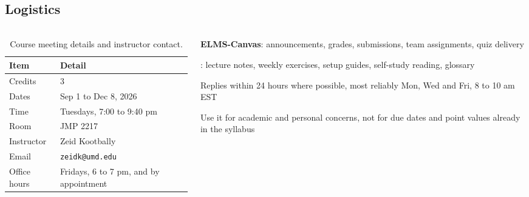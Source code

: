 \documentclass[
    10pt,
    dvipsnames,
    svgnames,
    x11names,
    aspectratio=1610,
    english,
    codeminted]{beamer}
\begin{document}
\subsection*{Logistics}
\begingroup
\divframetrue
\renewcommand{\divbartextA}{\secname}
\renewcommand{\divbartextB}{}
\begin{frame}{\secname}
  \divbar{\secname}{\subsecname}
  \framesubtitle{\subsecname}
\begin{columns}[T,onlytextwidth]
\begin{column}{0.48\textwidth}
\begin{table}[h]
\caption{Course meeting details and instructor contact.}
\footnotesize\centering
\renewcommand{\arraystretch}{1.2}
\begin{tabular}{m{1.8cm}m{3.4cm}}
  \toprule
  \textbf{Item} & \textbf{Detail} \\
  \midrule
  Credits      & 3 \\
  Dates        & Sep 1 to Dec 8, 2026 \\
  Time         & Tuesdays, 7:00 to 9:40 pm \\
  Room         & JMP 2217 \\
  Instructor   & Zeid Kootbally \\
  Email        & \texttt{zeidk@umd.edu} \\
  Office hours & Fridays, 6 to 7 pm, and by appointment \\
  \bottomrule
\end{tabular}
\end{table}
\end{column}
\begin{column}{0.48\textwidth}
\begin{compactitem}
\small
    \item \textbf{ELMS-Canvas}: announcements, grades, submissions, team assignments, quiz delivery
    \item {}: lecture notes, weekly exercises, setup guides, self-study reading, glossary
\end{compactitem}

\begin{compactitem}
\small
    \item Replies within 24 hours where possible, most reliably Mon, Wed and Fri, 8 to 10 am EST
    \item Use it for academic and personal concerns, not for due dates and point values already in the syllabus
\end{compactitem}
\end{column}
\end{columns}


\end{frame}
\end{document}
